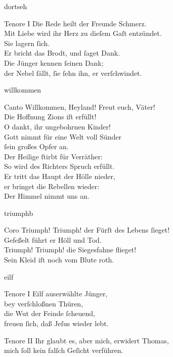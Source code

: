 \documentclass[tocstyle=ref-genre]{ees}
\begin{document}
{\begin{movement}{dortseh}
  \item[Tenore I]
  Die Rede heilt der Freunde Schmerz.\\
  Mit Liebe wird ihr Herz zu dieſem Gaſt entzündet.\\
  Sie lagern ſich.\\
  Er bricht das Brodt, und ſaget Dank.\\
  Die Jünger kennen ſeinen Dank;\\
  der Nebel fällt, ſie ſehn ihn, er verſchwindet.
\end{movement}

\begin{movement}{willkommen}
  \item[Canto]
  Willkommen, Heyland! Freut euch, Väter!\\
  Die Hoffnung Zions iſt erfüllt!\\
  O dankt, ihr ungebohrnen Kinder!\\
  Gott nimmt für eine Welt voll Sünder\\
  ſein großes Opfer an.\\
  Der Heilige ſtirbt für Verräther:\\
  So wird des Richters Spruch erfüllt.\\
  Er tritt das Haupt der Hölle nieder,\\
  er bringet die Rebellen wieder:\\
  Der Himmel nimmt uns an.
\end{movement}

\begin{movement}{triumphb}\enlargethispage\baselineskip
  \item[Coro]
  Triumph! Triumph! der Fürſt des Lebens ſieget!\\
  Gefeßelt führt er Höll und Tod.\\
  Triumph! Triumph! die Siegesfahne flieget!\\
  Sein Kleid iſt noch vom Blute roth.
\end{movement}

\begin{movement}{eilf}
  \item[Tenore I]
  Eilf auserwählte Jünger,\\
  bey verſchloßnen Thüren,\\
  die Wut der Feinde ſcheuend,\\
  freuen ſich, daß Jeſus wieder lebt.

  \item[Tenore II]
  Ihr glaubt es, aber mich, erwidert Thomas,\\
  mich ſoll kein falſch Geſicht verführen.


\end{movement}}
\end{document}
